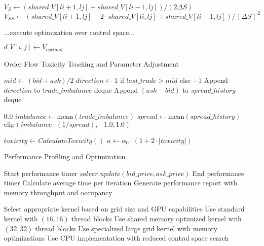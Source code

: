 \documentclass[onecolumn,ieee]{arithmaxresearch}
\begin{document}
\begin{onecolumn}
\begin{algorithm}
\begin{algorithmic}[1]
    \State {}
    \State $V_S \gets (shared\_V[li+1, lj] - shared\_V[li-1, lj])/(2\Delta S)$
    \State $V_{SS} \gets (shared\_V[li+1, lj] - 2 \cdot shared\_V[li, lj] + shared\_V[li-1, lj])/(\Delta S)^2$
    
    \State {}
    \State ...execute optimization over control space...
    
    \State $d\_V[i, j] \gets V_{optimal}$
\EndIf
\end{algorithmic}
\end{algorithm}


\begin{algorithm}
\caption{Order Flow Toxicity Tracking and Parameter Adjustment}
\begin{algorithmic}[1]
    \State $mid \gets (bid + ask)/2$
    \State $direction \gets 1$ if $last\_trade > mid$ else $-1$
    \State Append $direction$ to $trade\_imbalance$ deque
    \State Append $(ask - bid)$ to $spread\_history$ deque
\EndFunction

        \State \Return $0.0$
    \EndIf
    \State $imbalance \gets \text{mean}(trade\_imbalance)$
    \State $spread \gets \text{mean}(spread\_history)$
    \State \Return $\text{clip}(imbalance \cdot (1/spread), -1.0, 1.0)$
\EndFunction

\State {}
\State $toxicity \gets CalculateToxicity()$
\State $\alpha \gets \alpha_0 \cdot (1 + 2 \cdot |toxicity|)$ 
\end{algorithmic}
\end{algorithm}


\begin{algorithm}
\caption{Performance Profiling and Optimization}
\begin{algorithmic}[1]
    \State Start performance timer
        \State $solver.update(bid\_price, ask\_price)$
    \EndFor
    \State End performance timer
    \State Calculate average time per iteration
    \State Generate performance report with memory throughput and occupancy
\EndFunction

\State {}
    \State Select appropriate kernel based on grid size and GPU capabilities
        \State Use standard kernel with $(16, 16)$ thread blocks
        \State Use shared memory optimized kernel with $(32, 32)$ thread blocks
    \Else
        \State Use specialized large grid kernel with memory optimizations
    \EndIf
\Else
    \State Use CPU implementation with reduced control space search
\EndIf
\end{algorithmic}
\end{algorithm}


\end{onecolumn}
\end{document}

